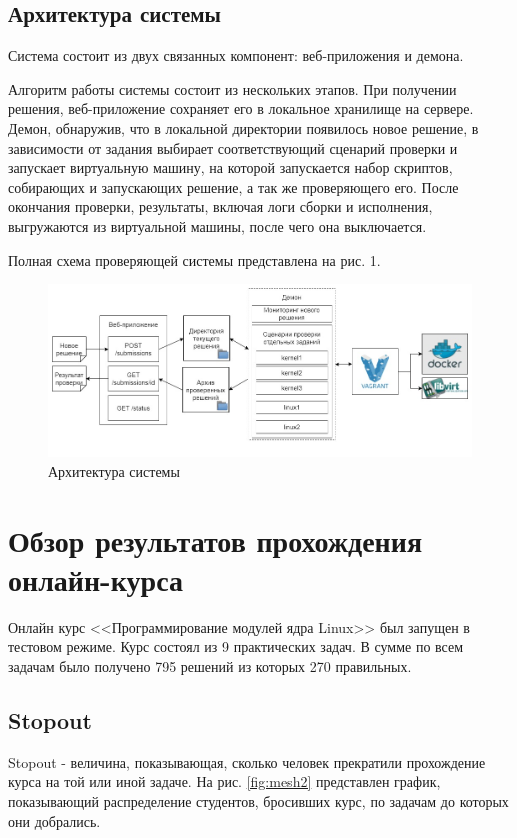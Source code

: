 \documentclass[a4paper,12pt]{article}
\begin{document}
\subsection{Архитектура системы}
Система состоит из двух связанных компонент: веб-приложения и демона.

Алгоритм работы системы состоит из нескольких этапов. При получении решения, веб-приложение сохраняет его в локальное хранилище на сервере. Демон, обнаружив, что в локальной директории появилось новое решение, в зависимости от задания выбирает соответствующий сценарий проверки и запускает виртуальную машину, на которой запускается набор скриптов, собирающих и запускающих решение, а так же проверяющего его. После окончания проверки, результаты, включая логи сборки и исполнения, выгружаются из виртуальной машины, после чего она выключается.

Полная схема проверяющей системы представлена на рис. 1.

\begin{figure}[h]
	\centering
	\includegraphics[width=\textwidth]{arch.jpg}
	\caption{Архитектура системы}
	\label{fig:mesh1}
\end{figure}

\section{Обзор результатов прохождения онлайн-курса}
Онлайн курс <<Программирование модулей ядра Linux>> был запущен в тестовом режиме. Курс состоял из 9 практических задач. В сумме по всем задачам было получено 795 решений из которых 270 правильных.

\subsection{Stopout}
Stopout - величина, показывающая, сколько человек прекратили прохождение курса на той или иной задаче. На рис. \ref{fig:mesh2} представлен график, показывающий распределение студентов, бросивших курс, по задачам до которых они добрались.
\end{document}
